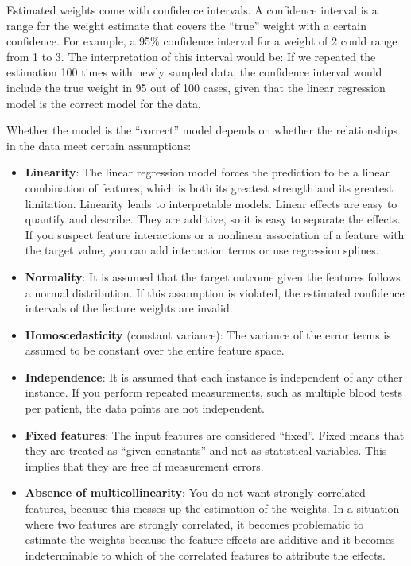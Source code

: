 Estimated weights come with confidence intervals. A confidence interval is a range for the weight estimate that covers the “true” weight with a certain confidence. For example, a 95\% confidence interval for a weight of 
2 could range from 1 to 3. The interpretation of this interval would be: If we repeated the estimation 100 times with newly sampled data, the confidence interval would include the true weight in 95 out of 100 cases, given 
that the linear regression model is the correct model for the data.
\newif\ifgooditem
\gooditemtrue
\newcommand\gooditem{\gooditemtrue\item}
\newcommand\baditem{\gooditemfalse\item}

Whether the model is the “correct” model depends on whether the relationships in the data meet certain assumptions:
\begin{itemize}
    \item \textbf{Linearity}: The linear regression model forces the
    prediction to be a linear combination of features, which is both its
    greatest strength and its greatest limitation. Linearity leads to
    interpretable models. Linear effects are easy to quantify and describe. They
    are additive, so it is easy to separate the effects. If you suspect feature
    interactions or a nonlinear association of a feature with the target value,
    you can add interaction terms or use regression splines.
    \item \textbf{Normality}: It is assumed that the target outcome given the features follows a normal distribution. If this assumption is violated, the estimated confidence intervals of the feature weights are invalid.
    \item \textbf{Homoscedasticity} (constant variance): The variance of the error terms is assumed to be constant over the entire feature space.
    \item \textbf{Independence}: It is assumed that each instance is independent of any other instance. If you perform repeated measurements, such as multiple blood tests per patient, the data points are not independent.
    \item \textbf{Fixed features}: The input features are considered “fixed”. Fixed means that they are treated as “given constants” and not as statistical variables. This implies that they are free of measurement errors.
    \item \textbf{Absence of multicollinearity}: You do not want strongly correlated features, because this messes up the estimation of the weights. In a situation where two features are strongly correlated, it becomes problematic to estimate the weights because the feature effects are additive and it becomes indeterminable to which of the correlated features to attribute the effects.
\end{itemize}

